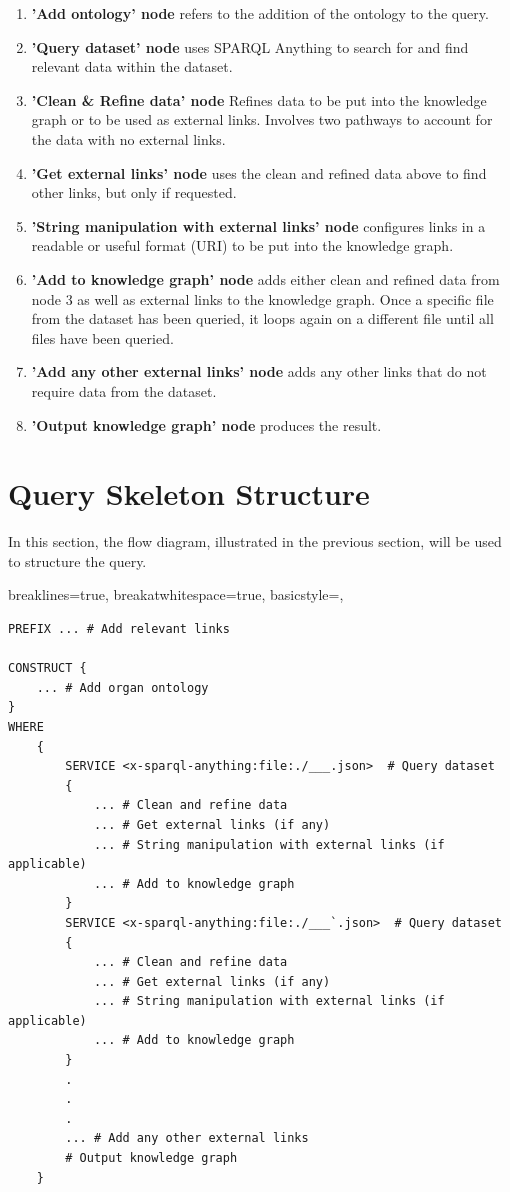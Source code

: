 \begin{enumerate}
  \item \textbf{'Add ontology' node} refers to the addition of the ontology to the query.
  \item \textbf{'Query dataset' node} uses SPARQL Anything to search for and find relevant data within the dataset.
  \item \textbf{'Clean \& Refine data' node} Refines data to be put into the knowledge graph or to be used as external links. Involves two pathways to account for the data with no external links.
  \item \textbf{'Get external links' node} uses the clean and refined data above to find other links, but only if requested.
  \item \textbf{'String manipulation with external links' node} configures links in a readable or useful format (URI) to be put into the knowledge graph.
  \item \textbf{'Add to knowledge graph' node} adds either clean and refined data from node 3 as well as external links to the knowledge graph. Once a specific file from the dataset has been queried, it loops again on a different file until all files have been queried.
  \item \textbf{'Add any other external links' node} adds any other links that do not require data from the dataset.
  \item \textbf{'Output knowledge graph' node} produces the result.
\end{enumerate}

\section{Query Skeleton Structure}
\hspace{0.5cm} In this section, the flow diagram, illustrated in the previous section, will be used to structure the query.

\lstset
{
    breaklines=true,
    breakatwhitespace=true,
    basicstyle=\ttfamily,
}
\begin{lstlisting}
PREFIX ... # Add relevant links

CONSTRUCT {
    ... # Add organ ontology
} 
WHERE 
    { 
        SERVICE <x-sparql-anything:file:./___.json>  # Query dataset
        { 
            ... # Clean and refine data
            ... # Get external links (if any)
            ... # String manipulation with external links (if applicable)
            ... # Add to knowledge graph
        } 
        SERVICE <x-sparql-anything:file:./___`.json>  # Query dataset
        { 
            ... # Clean and refine data
            ... # Get external links (if any)
            ... # String manipulation with external links (if applicable)
            ... # Add to knowledge graph
        } 
        .
        .
        .
        ... # Add any other external links 
        # Output knowledge graph
    }

\end{lstlisting}

